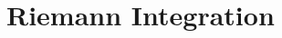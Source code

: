 \documentclass[a4paper]{report}
\author{Sheldon Axler}
\title{\ntitle}
\date{}
\begin{document}
\maketitle
\tableofcontents
\newpage

\chapter{Riemann Integration}
\end{document}
